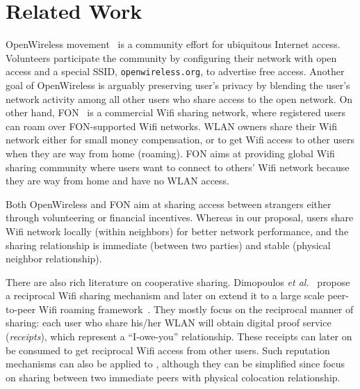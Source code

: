 \section{Related Work}
\label{sec:related}

OpenWireless movement~\cite{openwireless} is a community effort for ubiquitous
Internet access. Volunteers participate the community by configuring their
\wifi{} network with open access and a special SSID, \texttt{openwireless.org},
to advertise free access. Another goal of OpenWireless is arguably preserving
user's privacy by blending the user's network activity among all other users who
share access to the open \wifi{} network. On other hand, FON~\cite{fon} is a
commercial Wifi sharing network, where registered users can roam over
FON-supported Wifi networks. WLAN owners share their Wifi network either for
small money compensation, or to get Wifi access to other users when they are way
from home (roaming). FON aims at providing global Wifi sharing community where
users want to connect to others' Wifi network because they are way from home and
have no WLAN access. 

Both OpenWireless and FON aim at sharing \wifi{} access between strangers either
through volunteering or financial incentives. Whereas in our proposal, users share
Wifi network locally (within neighbors) for better network performance, and the
sharing relationship is immediate (between two parties) and stable (physical
neighbor relationship).

There are also rich literature on cooperative \wifi{} sharing. Dimopoulos
\textit{et al.}~\cite{efstathiou2010controlled} propose a reciprocal Wifi
sharing mechanism and later on extend it to a large scale peer-to-peer Wifi
roaming framework~\cite{dimopoulos2010exploiting}. They mostly focus on the
reciprocal manner of sharing: each user who share his/her WLAN will obtain
digital proof service (\textit{receipts}), which represent a ``I-owe-you''
relationship. These receipts can later on be consumed to get reciprocal Wifi
access from other users. Such reputation mechanisms can also be applied to
\wisefi{}, although they can be simplified since \wisefi{} focus on sharing
between two immediate peers with physical colocation relationship.
